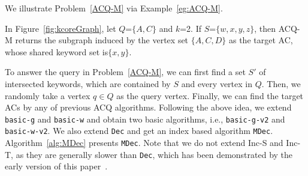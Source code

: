 {We illustrate Problem~\ref{ACQ-M} via Example~\ref{eg:ACQ-M}.

\begin{example}
\label{eg:ACQ-M}
In Figure~\ref{fig:kcoreGraph}, let $Q$=$\{A,C\}$ and $k$=2.
If $S$=$\{w,x,y,z\}$, then ACQ-M returns the subgraph induced by the vertex set $\{A,C,D\}$ as the target AC, whose shared keyword set is$\{x,y\}$.
\end{example}

To answer the query in Problem~\ref{ACQ-M}, we can first find a set $S'$ of intersected keywords, which are contained by $S$ and every vertex in $Q$. Then, we randomly take a vertex $q$$\in$$Q$ as the query vertex.
Finally, we can find the target ACs by any of previous ACQ algorithms.
Following the above idea, we extend {\tt basic-g} and {\tt basic-w} and obtain two basic algorithms, i.e., {\tt basic-g-v2} and {\tt basic-w-v2}. We also extend {\tt Dec} and get an index based algorithm {\tt MDec}.
Algorithm~\ref{alg:MDec} presents {\tt MDec}.
Note that we do not extend {Inc-S} and {Inc-T}, as they are generally slower than {\tt Dec}, which has been demonstrated by the early version of this paper~\cite{fangeffective}.


} 
